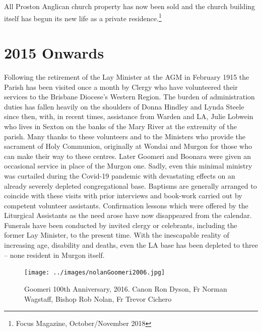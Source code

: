 All Proston Anglican church property has now been sold and the church building itself has begun its new life as a private residence.\footnote{Focus Magazine, October/November 2018}


\section{2015 Onwards}



Following the retirement of the Lay Minister at the AGM in February 1915 the Parish has been visited once a month by Clergy who have volunteered their services to the Brisbane Diocese's Western Region. The burden of administration duties has fallen heavily on the shoulders of Donna Hindley and Lynda Steele since then, with, in recent times, assistance from Warden and LA, Julie Lobwein who lives in Sexton on the banks of the Mary River at the extremity of the parish. Many thanks to these volunteers and to the Ministers who provide the sacrament of Holy Communion, originally at Wondai and Murgon for those who can make their way to these centres. Later Goomeri and Boonara were given an occasional service in place of the Murgon one. Sadly, even this minimal ministry was curtailed during the Covid-19 pandemic with devastating effects on an already severely depleted congregational base. Baptisms are generally arranged to coincide with these visits with prior interviews and book-work carried out by competent volunteer assistants. Confirmation lessons which were offered by the Liturgical Assistants as the need arose have now disappeared from the calendar. Funerals have been conducted by invited clergy or celebrants, including the former Lay Minister, to the present time. With the inescapable reality of increasing age, disability and deaths, even the LA base has been depleted to three -- none resident in Murgon itself.









\begin{figure}[!htb]
\begin{center}
\texttt{[image: ../images/nolanGoomeri2006.jpg]}
\caption{Goomeri 100th Anniversary, 2016. Canon Ron Dyson, Fr Norman Wagstaff, Bishop Rob Nolan, Fr Trevor Cichero}
\end{center}
\end{figure}




